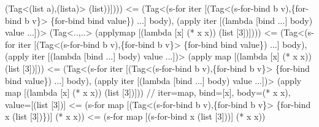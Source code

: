 \begin{Codes}
        (Tag<(list a),(list\C a)> (list\C [3]))])))
<= (Tag<(s-for iter
         [(Tag<(s-for-bind b v),\{for-bind b v\}>
             \{for-bind bind value\}) ...]
           body),
         (apply iter [(lambda [bind ...] body) value ...])>
      (Tag<..,..> (apply\C map [(lambda [x] (* x x))
        (list [3])])))
<= (Tag<(s-for iter
         [(Tag<(s-for-bind b v),\{for-bind b v\}>
             \{for-bind bind value\}) ...]
           body),
         (apply iter [(lambda [bind ...] body) value ...])>
      (apply map [(lambda [x] (* x x)) (list [3])]))
<= (Tag<(s-for iter
         [(Tag<(s-for-bind b v),\{for-bind b v\}>
             \{for-bind bind value\}) ...]
           body),
         (apply iter [(lambda [bind ...] body) value ...])>
      (apply map [(lambda [x] (* x x)) (list [3])]))
  // iter=map, bind=[x], body=(* x x), value=[(list [3])]
<= (s-for map
     [(Tag<(s-for-bind b v),\{for-bind b v\}>
        \{for-bind x (list [3])\})]
     (* x x))
<= (s-for map
     [(s-for-bind x (list [3]))]
     (* x x))
\end{Codes}

